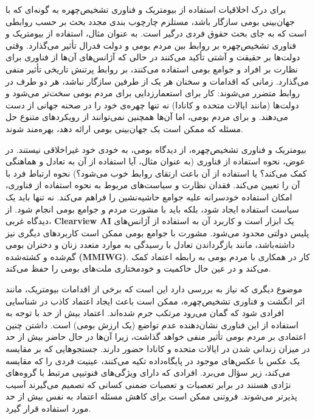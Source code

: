 برای درک اخلاقیات استفاده از بیومتریک و فناوری تشخیص‌چهره به گونه‌ای که با جهان‌بینی بومی سازگار باشد، مستلزم چارچوب بندی مجدد بحث بر حسب روابطی است که به جای بحث حقوق فردی درگیر است.
به عنوان مثال، استفاده از بیومتریک و فناوری تشخیص‌چهره بر روابط بین مردم بومی و دولت فدرال تأثیر می‌گذارد.
وقتی دولت‌ها بر حقیقت و آشتی تأکید می‌کنند در حالی که آژانس‌های آن‌ها از فناوری برای نظارت بر افراد و جوامع بومی استفاده می‌کنند، بر روابط پرتنش تاریخی تأثیر منفی می‌گذارد.
زمانی که اقدامات و سخنان هر یک از طرفین سازگار نباشد، هر دو طرف در روابط متضرر می‌شوند: کار برای استعمارزدایی برای مردم بومی سخت‌تر می‌شود و دولت‌ها (مانند ایالات متحده و کانادا) نه تنها چهره‌ی خود را در صحنه جهانی از دست می‌دهند.
و برای مردم بومی، اما آن‌ها همچنین نمی‌توانند از رویکردهای متنوع حل مسئله که ممکن است یک جهان‌بینی بومی ارائه دهد، بهره‌مند شوند.

بیومتریک و فناوری تشخیص‌چهره، از دیدگاه بومی، به خودی خود غیراخلاقی نیستند.
در عوض، نحوه استفاده از فناوری (به عنوان مثال، آیا استفاده از آن به تعادل و هماهنگی کمک می‌کند؟ یا استفاده از آن باعث ارتقای روابط خوب می‌شود؟) نحوه ارتباط فرد با آن را تعیین می‌کند.
فقدان نظارت و سیاست‌های مربوط به نحوه استفاده از فناوری، امکان استفاده خودسرانه علیه جوامع حاشیه‌نشین را فراهم می‌کند.
نه تنها باید یک سیاست استفاده ایجاد شود، بلکه باید با مشورت مردم و جوامع بومی انجام شود.
از دیدگاه غربی، \textenglish{\textbf{Clearview AI}} یک ابزار است و کاربرد آن به استفاده از آژانس‌های پلیس دولتی محدود می‌شود.
مشورت با جوامع بومی ممکن است کاربردهای دیگری نیز داشته‌باشد، مانند بازگرداندن تعادل با رسیدگی به موارد متعدد زنان و دختران بومی گم‌شده و کشته‌شده \textenglish{\textbf{(MMIWG)}}. کار در همکاری با مردم بومی به رابطه اعتماد کمک می‌کند و در عین حال حاکمیت و خودمختاری ملت‌های بومی را حفظ می‌کند.

موضوع دیگری که نیاز به بررسی دارد این است که برخی از اقدامات بیومتریک، مانند اثر انگشت و فناوری تشخیص‌چهره، ممکن است باعث ایجاد اعتماد کاذب در شناسایی افرادی شود که گمان می‌رود مرتکب جرم شده‌اند.
اعتماد بیش از حد با توجه به استفاده از این فناوری نشان‌دهنده عدم تواضع (یک ارزش بومی) است.
داشتن چنین اعتمادی بر مردم بومی تأثیر منفی خواهد گذاشت، زیرا آن‌ها در حال حاضر بیش از حد در میزان زندانی شدن در ایالات متحده و کانادا حضور دارند.
جستجوهایی که بر مقایسه یک عکس با عکس‌های موجود در پایگاه‌داده تکیه می‌کنند، عینیت فردی را که مقایسه می‌کند، زیر سؤال می‌برد.
افرادی که دارای ویژگی‌های فنوتیپی مرتبط با گروه‌های نژادی هستند در برابر تعصبات و تعصبات ضمنی کسانی که تصمیم می‌گیرند آسیب پذیرتر می‌شوند.
فروتنی ممکن است برای کاهش مسئله اعتماد به نفس بیش از حد مورد استفاده قرار گیرد.
\newline
\newline



